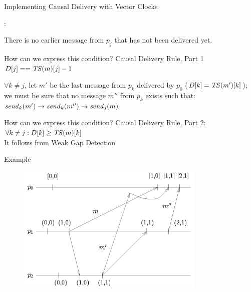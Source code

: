 

\begin{frame}{Implementing Causal Delivery with Vector Clocks}

:

\BIL

\item There is no earlier message from $p_j$ that has not been delivered yet.
\begin{overprint}
 \alert{How can we express this condition?}
  \alert{Causal Delivery Rule, Part 1}  $D[j] == \mathit{TS}(m)[j] -1$
\end{overprint}

\item $\forall k \neq j$, let $m'$ be the last message from $p_k$ delivered by $p_0$ ($D[k] = \mathit{TS}(m')[k]$); 
we must be sure that no message $m''$ from $p_k$ exists such that:
$
\mathit{send}_k(m') \rightarrow \mathit{send}_k(m'') \rightarrow \mathit{send}_j(m)
$
\begin{overprint}
  \alert{How can we express this condition?}
\alert{Causal Delivery Rule, Part 2}: $\forall k \neq j: D[k] \geq \mathit{TS}(m)[k]$\\
It follows from Weak Gap Detection
\end{overprint}

\EIL

\end{frame}

\begin{frame}{Example}
\begin{figure} 
\includegraphics[width=9cm]{figs/03/figure-8}
\end{figure}
\end{frame}

